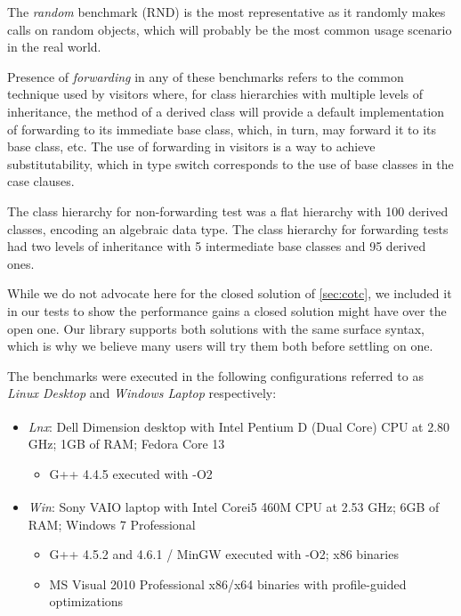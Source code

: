 The \emph{random} benchmark (RND) is the most representative as it randomly makes calls on 
random objects, which will probably be the most common usage scenario in the 
real world.

Presence of \emph{forwarding} in any of these benchmarks refers to the 
common technique used by visitors where, for class hierarchies with multiple 
levels of inheritance, the  method of a derived class will provide a 
default implementation of forwarding to its immediate base class, which, in turn, 
may forward it to its base class, etc. The use of forwarding in visitors is a 
way to achieve substitutability, which in type switch corresponds to the use 
of base classes in the case clauses.

The class hierarchy for non-forwarding test was a flat hierarchy with 100 
derived classes, encoding an algebraic data type. The class hierarchy for 
forwarding tests had two levels of inheritance with 5 intermediate base classes 
and 95 derived ones. 

While we do not advocate here for the closed solution of 
\textsection\ref{sec:cotc}, we included it in our tests to show the performance 
gains a closed solution might have over the open one. Our library supports both 
solutions with the same surface syntax, which is why we believe many users will 
try them both before settling on one. 

The benchmarks were executed in the following configurations referred to as 
\emph{Linux Desktop} and \emph{Windows Laptop} respectively:

\begin{itemize}
\setlength{\itemsep}{0pt}
\setlength{\parskip}{0pt}
\item \emph{Lnx}: Dell Dimension\textsuperscript{\textregistered} desktop with Intel\textsuperscript{\textregistered} Pentium\textsuperscript{\textregistered} 
      D (Dual Core) CPU at 2.80 GHz; 1GB of RAM; Fedora Core 13  
      \begin{itemize}
      \setlength{\itemsep}{0pt}
      \setlength{\parskip}{0pt}
      \item G++ 4.4.5 executed with -O2
      \end{itemize}
\item \emph{Win}: Sony VAIO\textsuperscript{\textregistered} laptop with Intel\textsuperscript{\textregistered} Core\texttrademark i5 460M 
      CPU at 2.53 GHz; 6GB of RAM; Windows 7 Professional
      \begin{itemize}
      \setlength{\itemsep}{0pt}
      \setlength{\parskip}{0pt}
      \item G++ 4.5.2 and 4.6.1 / MinGW executed with -O2; x86 binaries
      \item MS Visual \Cpp{} 2010 Professional x86/x64 binaries with profile-guided optimizations
      \end{itemize}
\end{itemize}

